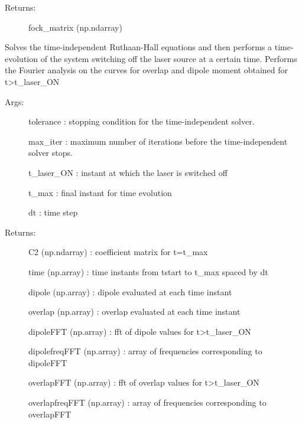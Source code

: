 \documentclass[letterpaper,10pt,english]{sphinxmanual}
\begin{document}
\begin{fulllineitems}
\begin{fulllineitems}
\begin{description}
\item[{Returns:}] \leavevmode
fock\_matrix (np.ndarray)

\end{description}

\end{fulllineitems}


\begin{fulllineitems}
\label{\detokenize{index:do.GHF.fourier_analysis}}
Solves the time-independent Ruthaan-Hall equations and then performs a time-evolution of the system switching off the laser source at a certain time.
Performs the Fourier analysis on the curves for overlap and dipole moment obtained for t\textgreater{}t\_laser\_ON
\begin{description}
\item[{Args:}] \leavevmode
tolerance : stopping condition for the time-independent solver.

max\_iter : maximum number of iterations before the time-independent solver stops.

t\_laser\_ON : instant at which the laser is switched off

t\_max : final instant for time evolution

dt : time step

\item[{Returns:}] \leavevmode
C2 (np.ndarray) : coefficient matrix for t=t\_max

time (np.array) : time instants from tstart to t\_max spaced by dt

dipole (np.array) : dipole evaluated at each time instant

overlap (np.array) : overlap evaluated at each time instant

dipoleFFT (np.array) : fft of dipole values for t\textgreater{}t\_laser\_ON

dipolefreqFFT (np.array) : array of frequencies corresponding to dipoleFFT

overlapFFT (np.array) : fft of overlap values for t\textgreater{}t\_laser\_ON

overlapfreqFFT (np.array) : array of frequencies corresponding to overlapFFT

\end{description}


\end{fulllineitems}
\end{fulllineitems}
\end{document}
